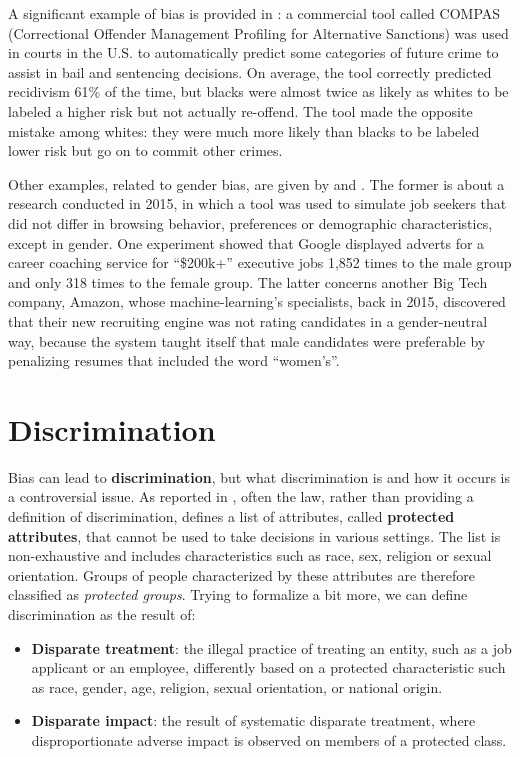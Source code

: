 A significant example of bias is provided in \cite{angwin2016machine}: a commercial tool called COMPAS (Correctional Offender Management Profiling for Alternative Sanctions) was used in courts in the U.S. to automatically predict some categories of future crime to assist in bail and sentencing decisions. On average, the tool correctly predicted recidivism 61\% of the time, but blacks were almost twice as likely as whites to be labeled a higher risk but not actually re-offend. The tool made the opposite mistake among whites: they were much more likely than blacks to be labeled lower risk but go on to commit other crimes.

Other examples, related to gender bias, are given by \cite{gibbs2015women} and \cite{dastin2018amazon}. The former is about a research conducted in 2015, in which a tool was used to simulate job seekers that did not differ in browsing behavior, preferences or demographic characteristics, except in gender. One experiment showed that Google displayed adverts for a career coaching service for ``\$200k+'' executive jobs 1,852 times to the male group and only 318 times to the female group. The latter concerns another Big Tech company, Amazon, whose machine-learning's specialists, back in 2015, discovered that their new recruiting engine was not rating candidates in a gender-neutral way, because the system taught itself that male candidates were preferable by penalizing resumes that included the word ``women's''.


\section{Discrimination}
Bias can lead to \textbf{discrimination}, but what discrimination is and how it occurs is a controversial issue. As reported in \cite{scantamburlo2018machine}, often the law, rather than providing a definition of discrimination, defines a list of attributes, called \textbf{protected attributes}, that cannot be used to take decisions in various settings. The list is non-exhaustive and includes characteristics such as race, sex, religion or sexual orientation. Groups of people characterized by these attributes are therefore classified as \textit{protected groups}. Trying to formalize a bit more, we can define discrimination as the result of:
\begin{itemize}
\item \textbf{Disparate treatment}: the illegal practice of treating an entity, such as a job applicant or an employee, differently based on a protected characteristic such as race, gender, age, religion, sexual orientation, or national origin.
\item \textbf{Disparate impact}: the result of systematic disparate treatment, where disproportionate adverse impact is observed on members of a protected class.
\end{itemize}

